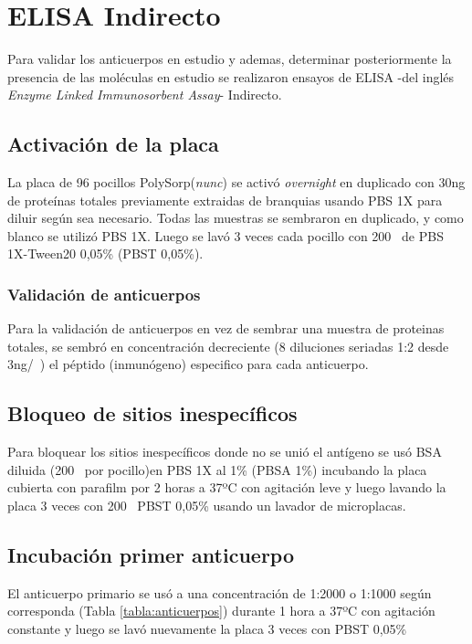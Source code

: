 \documentclass[12pt,letterpaper,oneside]{scrbook}
\begin{document}
\section{ELISA Indirecto}

Para validar los anticuerpos en estudio y ademas, determinar
posteriormente la presencia de las moléculas en estudio se realizaron
ensayos de ELISA -del inglés \emph{Enzyme Linked Immunosorbent Assay}-
Indirecto.

\subsection{Activación de la placa}

La placa de 96 pocillos
PolySorp\textregistered (\emph{nunc\texttrademark}) se activó
\emph{overnight} en duplicado con 30ng de proteínas totales previamente
extraidas de branquias usando PBS 1X para diluir según sea necesario.
Todas las muestras se sembraron en duplicado, y como blanco se utilizó
PBS 1X. Luego se lavó 3 veces cada pocillo con 200\si{\micro\litro} de
PBS 1X-Tween20 0,05\% (PBST 0,05\%).

\subsubsection{Validación de anticuerpos}

Para la validación de anticuerpos en vez de sembrar una muestra de
proteinas totales, se sembró en concentración decreciente (8 diluciones
seriadas 1:2 desde 3ng/\si{\micro\litro}) el péptido (inmunógeno)
especifico para cada anticuerpo.

\subsection{Bloqueo de sitios inespecíficos}

Para bloquear los sitios inespecíficos donde no se unió el antígeno se
usó BSA diluida (200\si{\micro\litro} por pocillo)en PBS 1X al 1\% (PBSA
1\%) incubando la placa cubierta con parafilm por 2 horas a 37ºC con
agitación leve y luego lavando la placa 3 veces con 200\si{\micro\litro}
PBST 0,05\% usando un lavador de microplacas.

\subsection{Incubación primer anticuerpo}

El anticuerpo primario se usó a una concentración de 1:2000 o 1:1000
según corresponda (Tabla \ref{tabla:anticuerpos}) durante 1 hora a 37ºC
con agitación constante y luego se lavó nuevamente la placa 3 veces con
PBST 0,05\%
\end{document}
